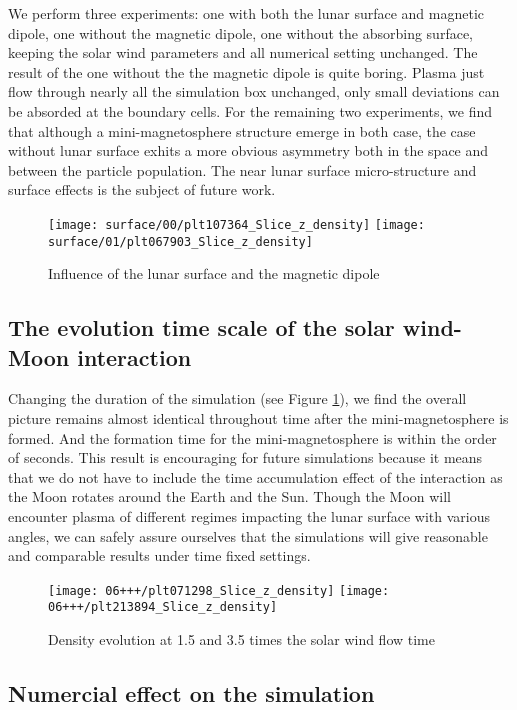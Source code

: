 We perform three experiments: one with both the lunar surface and magnetic dipole, one without the magnetic dipole, one without the absorbing surface, keeping the solar wind parameters and all numerical setting unchanged. The result of the one without the the magnetic dipole is quite boring. Plasma just flow through nearly all the simulation box unchanged, only small deviations can be absorded at the boundary cells. For the remaining two experiments, we find that although a mini-magnetosphere structure emerge in both case, the case without lunar surface exhits a more obvious asymmetry both in the space and between the particle population. The near lunar surface micro-structure and surface effects is the subject of future work.

\begin{figure}
  \centering
  {\texttt{[image: surface/00/plt107364\_Slice\_z\_density]}}
  {\texttt{[image: surface/01/plt067903\_Slice\_z\_density]}}
\caption{Influence of the lunar surface and the magnetic dipole}
\end{figure}

\subsection{The evolution time scale of the solar wind-Moon interaction}

Changing the duration of the simulation (see Figure \ref{fig:evolution}), we find the overall picture remains almost identical throughout time after the mini-magnetosphere is formed. And the formation time for the mini-magnetosphere is within the order of seconds. This result is encouraging for future simulations because it means that we do not have to include the time accumulation effect of the interaction as the Moon rotates around the Earth and the Sun. Though the Moon will encounter plasma of different regimes impacting the lunar surface with various angles, we can safely assure ourselves that the simulations will give reasonable and comparable results under time fixed settings. 


\begin{figure}
  \centering
  {\texttt{[image: 06+++/plt071298\_Slice\_z\_density]}}
  {\texttt{[image: 06+++/plt213894\_Slice\_z\_density]}}
\caption{Density evolution at 1.5 and 3.5 times the solar wind flow time}\label{fig:evolution}
\end{figure}

\subsection{Numercial effect on the simulation}

